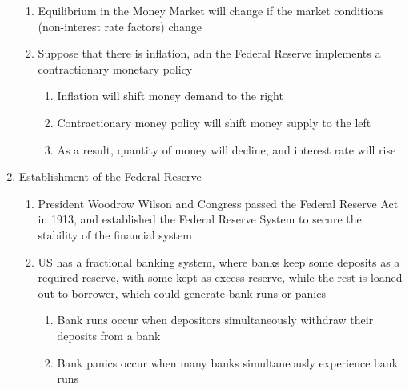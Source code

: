 \documentclass[12pt]{article}
\begin{document}
\begin{enumerate}
        \begin{enumerate}

          \item Equilibrium in the Money Market will change if the market conditions (non-interest rate factors) change

          \item Suppose that there is inflation, adn the Federal Reserve implements a contractionary monetary policy

            \begin{enumerate}

              \item Inflation will shift money demand to the right

              \item Contractionary money policy will shift money supply to the left

              \item As a result, quantity of money will decline, and interest rate will rise

            \end{enumerate}

        \end{enumerate}

      \item Establishment of the Federal Reserve

        \begin{enumerate}

          \item President Woodrow Wilson and Congress passed the Federal Reserve Act in 1913, and established the Federal Reserve System to secure the stability of the financial system

          \item US has a fractional banking system, where banks keep some deposits as a required reserve, with some kept as excess reserve, while the rest is loaned out to borrower, which could generate bank runs or panics

            \begin{enumerate}

              \item Bank runs occur when depositors simultaneously withdraw their deposits from a bank

              \item Bank panics occur when many banks simultaneously experience bank runs

            \end{enumerate}


\end{enumerate}
\end{enumerate}
\end{document}
